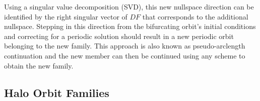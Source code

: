 Using a singular value decomposition (SVD), this new nullspace direction can be identified by the
right singular vector of $DF$ that corresponds to the additional nullspace. Stepping in this
direction from the bifurcating orbit's initial conditions and correcting for a periodic solution
should result in a new periodic orbit belonging to the new family. This approach is also known as
pseudo-arclength continuation and the new member can then be continued using any scheme to obtain
the new family.

\subsection{Halo Orbit Families}

